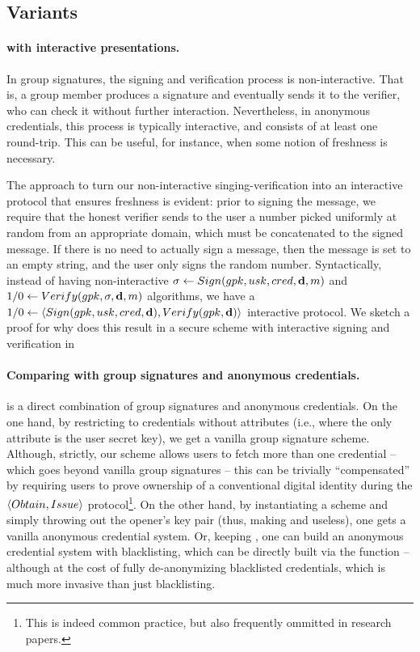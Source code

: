 \subsection{\GSAC Variants}
\label{ssec:variants-gsac}

\paragraph{\GSAC with interactive presentations.} %
In group signatures, the signing and verification process is non-interactive.
That is, a group member produces a signature and eventually sends it to the
verifier, who can check it without further interaction. Nevertheless, in
anonymous credentials, this process is typically interactive, and consists of
at least one round-trip. This can be useful, for instance, when some notion of
freshness is necessary.

The approach to turn our non-interactive singing-verification into an
interactive protocol that ensures freshness is evident: prior to signing the
message, we require that the honest verifier sends to the user a number picked
uniformly at random from an appropriate domain, which must be concatenated to
the signed message. If there is no need to actually sign a message, then the
message is set to an empty string, and the user only signs the random number.
%
Syntactically, instead of having non-interactive $\sigma \gets Sign(gpk,usk,
cred,\mathbf{d},m)$ and $1/0 \gets Verify(gpk,\sigma,\mathbf{d},m)$ algorithms,
we have a $1/0 \gets \langle Sign(gpk,usk,cred,\mathbf{d}),Verify(gpk,
\mathbf{d}) \rangle$ interactive protocol.
%
We sketch a proof for why does this result in a secure
\GSAC scheme with interactive signing and verification in

\paragraph{Comparing \GSAC with group signatures and anonymous
  credentials.} %

\GSAC is a direct combination of group signatures and anonymous credentials.
%
On the one hand, by restricting to credentials without attributes (i.e., where
the only attribute is the user secret key), we get a vanilla group signature
scheme. Although, strictly, our scheme allows users to fetch more than one
credential -- which goes beyond vanilla group signatures -- this can be
trivially ``compensated'' by requiring users to prove ownership of a
conventional digital identity during the $\langle Obtain,Issue \rangle$
protocol\footnote{This is indeed common practice, but also frequently ommitted
  in research papers.}.
%
On the other hand, by instantiating a \GSAC scheme and simply
throwing out the opener's key pair (thus, making \Open and \Judge useless), one
gets a vanilla anonymous credential system. Or, keeping \osk, one can build an
anonymous credential system with blacklisting, which can be directly built via
the \Open function -- although at the cost of fully de-anonymizing blacklisted
credentials, which is much more invasive than just blacklisting.

